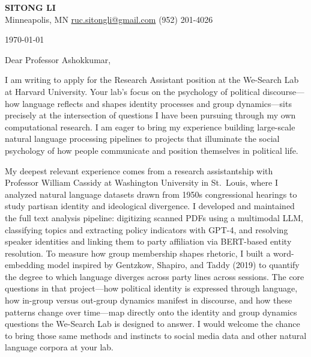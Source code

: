 \documentclass[12pt]{article}
\begin{document}
\begin{center}
  {\LARGE\textbf{\textcolor{accent}{SITONG LI}}} \\[4pt]
  \small Minneapolis, MN
  \;\textbullet\;
  \href{mailto:ruc.sitongli@gmail.com}{ruc.sitongli@gmail.com}
  \;\textbullet\;
  (952) 201-4026
\end{center}

\vspace{1em}

\noindent \today

\vspace{1em}

\noindent Dear Professor Ashokkumar,

\vspace{1em}

I am writing to apply for the Research Assistant position at the We-Search Lab at Harvard University. Your lab's focus on the psychology of political discourse---how language reflects and shapes identity processes and group dynamics---sits precisely at the intersection of questions I have been pursuing through my own computational research. I am eager to bring my experience building large-scale natural language processing pipelines to projects that illuminate the social psychology of how people communicate and position themselves in political life.

My deepest relevant experience comes from a research assistantship with Professor William Cassidy at Washington University in St.\ Louis, where I analyzed natural language datasets drawn from 1950s congressional hearings to study partisan identity and ideological divergence. I developed and maintained the full text analysis pipeline: digitizing scanned PDFs using a multimodal LLM, classifying topics and extracting policy indicators with GPT-4, and resolving speaker identities and linking them to party affiliation via BERT-based entity resolution. To measure how group membership shapes rhetoric, I built a word-embedding model inspired by Gentzkow, Shapiro, and Taddy (2019) to quantify the degree to which language diverges across party lines across sessions. The core questions in that project---how political identity is expressed through language, how in-group versus out-group dynamics manifest in discourse, and how these patterns change over time---map directly onto the identity and group dynamics questions the We-Search Lab is designed to answer. I would welcome the chance to bring those same methods and instincts to social media data and other natural language corpora at your lab.
\end{document}
